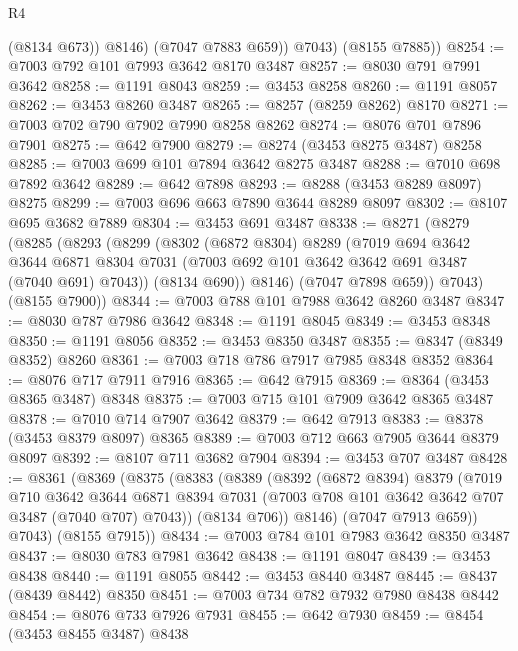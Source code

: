 \begin{lexlean}{R4}
\begin{coremodule}
              (@8134 @673))
            @8146)
          (@7047 @7883 @659))
        @7043)
      (@8155 @7885))
@8254 := @7003 @792 @101 @7993 @3642 @8170 @3487
@8257 := @8030 @791 @7991 @3642
@8258 := @1191 @8043
@8259 := @3453 @8258
@8260 := @1191 @8057
@8262 := @3453 @8260 @3487
@8265 := @8257 (@8259 @8262) @8170
@8271 := @7003 @702 @790 @7902 @7990 @8258 @8262
@8274 := @8076 @701 @7896 @7901
@8275 := @642 @7900
@8279 := @8274 (@3453 @8275 @3487) @8258
@8285 := @7003 @699 @101 @7894 @3642 @8275 @3487
@8288 := @7010 @698 @7892 @3642
@8289 := @642 @7898
@8293 := @8288 (@3453 @8289 @8097) @8275
@8299 := @7003 @696 @663 @7890 @3644 @8289 @8097
@8302 := @8107 @695 @3682 @7889
@8304 := @3453 @691 @3487
@8338 := @8271
    (@8279
      (@8285
        (@8293
          (@8299
            (@8302
              (@6872 @8304)
              @8289
              (@7019
                @694
                @3642
                @3644
                @6871
                @8304
                @7031
                (@7003 @692 @101 @3642 @3642 @691 @3487 (@7040 @691) @7043))
              (@8134 @690))
            @8146)
          (@7047 @7898 @659))
        @7043)
      (@8155 @7900))
@8344 := @7003 @788 @101 @7988 @3642 @8260 @3487
@8347 := @8030 @787 @7986 @3642
@8348 := @1191 @8045
@8349 := @3453 @8348
@8350 := @1191 @8056
@8352 := @3453 @8350 @3487
@8355 := @8347 (@8349 @8352) @8260
@8361 := @7003 @718 @786 @7917 @7985 @8348 @8352
@8364 := @8076 @717 @7911 @7916
@8365 := @642 @7915
@8369 := @8364 (@3453 @8365 @3487) @8348
@8375 := @7003 @715 @101 @7909 @3642 @8365 @3487
@8378 := @7010 @714 @7907 @3642
@8379 := @642 @7913
@8383 := @8378 (@3453 @8379 @8097) @8365
@8389 := @7003 @712 @663 @7905 @3644 @8379 @8097
@8392 := @8107 @711 @3682 @7904
@8394 := @3453 @707 @3487
@8428 := @8361
    (@8369
      (@8375
        (@8383
          (@8389
            (@8392
              (@6872 @8394)
              @8379
              (@7019
                @710
                @3642
                @3644
                @6871
                @8394
                @7031
                (@7003 @708 @101 @3642 @3642 @707 @3487 (@7040 @707) @7043))
              (@8134 @706))
            @8146)
          (@7047 @7913 @659))
        @7043)
      (@8155 @7915))
@8434 := @7003 @784 @101 @7983 @3642 @8350 @3487
@8437 := @8030 @783 @7981 @3642
@8438 := @1191 @8047
@8439 := @3453 @8438
@8440 := @1191 @8055
@8442 := @3453 @8440 @3487
@8445 := @8437 (@8439 @8442) @8350
@8451 := @7003 @734 @782 @7932 @7980 @8438 @8442
@8454 := @8076 @733 @7926 @7931
@8455 := @642 @7930
@8459 := @8454 (@3453 @8455 @3487) @8438

\end{coremodule}
\end{lexlean}
